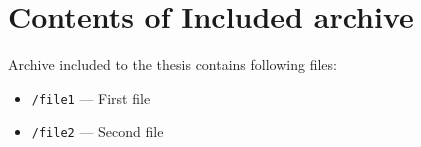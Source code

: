\chapter{Contents of Included archive \label{appendix:contents} }

Archive included to the thesis contains following files:

\begin{itemize}[noitemsep]
\item \texttt{/file1} --- First file
\item \texttt{/file2} --- Second file
\end{itemize}
